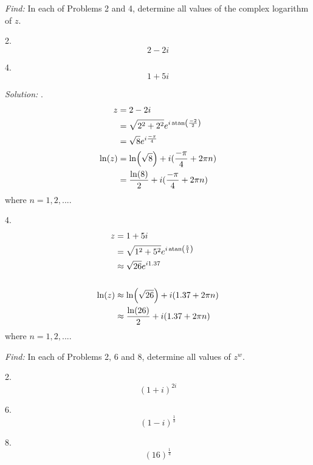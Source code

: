 \documentclass[11pt]{homework}
\begin{document}
\newpage
{}
\emph{Find:}
In each of Problems 2 and 4,
determine all values of the 
complex logarithm of $z$.

2. 
\begin{equation*}
  2 - 2i
\end{equation*}

4. 
\begin{equation*}
  1 + 5i
\end{equation*}

\emph{Solution:}
.
\begin{align*}
  z&= 2-2i  \\
   &= \sqrt{2^2 + 2^2} e^{i \atan(\frac{-2}{2})} \\
   &= \sqrt{8} e^{i \frac{-\pi}{4}}
  \\
 \ln(z) &= \ln(\sqrt{8}) + i (\frac{-\pi}{4} + 2\pi n) \\
    &= \frac{\ln(8)}{2} + i (\frac{-\pi}{4} + 2\pi n) 
\end{align*}
where $n=1,2,...$.

4.
\begin{align*}
  z&= 1+5i \\
   &= \sqrt{1^2 + 5^2} e^{i\atan(\frac{5}{1})} \\
   &\approx \sqrt{26} e^{i 1.37} \\
  \\
\ln(z) &\approx \ln( \sqrt{26}) + i( 1.37 +2\pi n) \\
       &\approx \frac{\ln( 26)}{2} + i( 1.37 +2\pi n)
\end{align*}
where $n=1,2,...$.


\emph{Find:}
In each of Problems 2, 6 and 8,
determine all values of $z^w$.

2.
\begin{equation*}
  (1+i)^{2i}
\end{equation*}

6.
\begin{equation*}
  (1-i)^{\frac{1}{3}}
\end{equation*}

8.
\begin{equation*}
  (16)^{\frac{1}{4}}
\end{equation*}
\end{document}
